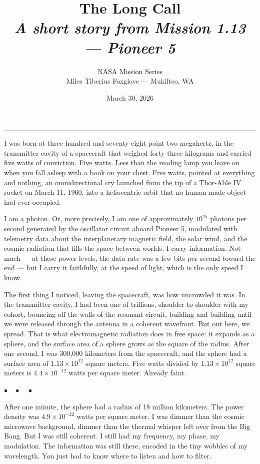 \documentclass[12pt, letterpaper]{article}
\title{\Huge\textbf{The Long Call}\\[0.5em]\large\textit{A short story from Mission 1.13 --- Pioneer 5}}
\author{NASA Mission Series\\[0.3em]\small Miles Tiberius Foxglove --- Mukilteo, WA}
\date{March 30, 2026}
\begin{document}
\maketitle
\thispagestyle{empty}

\vspace{1em}
\noindent\rule{\textwidth}{0.4pt}
\vspace{1em}

\noindent I was born at three hundred and seventy-eight point two megahertz, in the transmitter cavity of a spacecraft that weighed forty-three kilograms and carried five watts of conviction. Five watts. Less than the reading lamp you leave on when you fall asleep with a book on your chest. Five watts, pointed at everything and nothing, an omnidirectional cry launched from the tip of a Thor-Able IV rocket on March 11, 1960, into a heliocentric orbit that no human-made object had ever occupied.

I am a photon. Or, more precisely, I am one of approximately $10^{25}$ photons per second generated by the oscillator circuit aboard Pioneer 5, modulated with telemetry data about the interplanetary magnetic field, the solar wind, and the cosmic radiation that fills the space between worlds. I carry information. Not much --- at these power levels, the data rate was a few bits per second toward the end --- but I carry it faithfully, at the speed of light, which is the only speed I know.

The first thing I noticed, leaving the spacecraft, was how uncrowded it was. In the transmitter cavity, I had been one of trillions, shoulder to shoulder with my cohort, bouncing off the walls of the resonant circuit, building and building until we were released through the antenna in a coherent wavefront. But out here, we spread. That is what electromagnetic radiation does in free space: it expands as a sphere, and the surface area of a sphere grows as the square of the radius. After one second, I was 300,000 kilometers from the spacecraft, and the sphere had a surface area of $1.13 \times 10^{12}$ square meters. Five watts divided by $1.13 \times 10^{12}$ square meters is $4.4 \times 10^{-12}$ watts per square meter. Already faint.

\begin{center}
$\bullet\quad\bullet\quad\bullet$
\end{center}

After one minute, the sphere had a radius of 18 million kilometers. The power density was $4.9 \times 10^{-22}$ watts per square meter. I was dimmer than the cosmic microwave background, dimmer than the thermal whisper left over from the Big Bang. But I was still coherent. I still had my frequency, my phase, my modulation. The information was still there, encoded in the tiny wobbles of my wavelength. You just had to know where to listen and how to filter.
\end{document}
